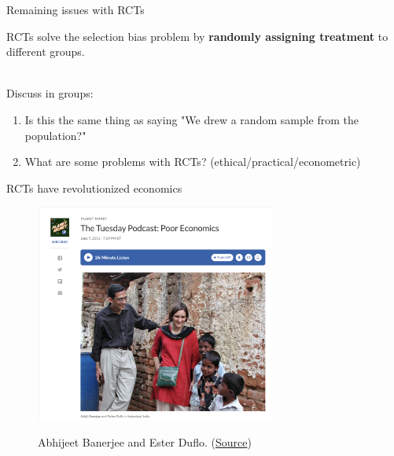 \documentclass[11pt]{beamer}
\begin{document}
\begin{frame}{Remaining issues with RCTs}

RCTs solve the selection bias problem by \textbf{randomly assigning treatment} to different groups.


   \begin{alertblock} {\centering \vspace{-1.5ex} \\ Discuss in groups: \begin{enumerate} 
   \item Is this the same thing as saying "We drew a random sample from the population?" 
   \item What are some problems with RCTs? \tiny{(ethical/practical/econometric)}  
   \end{enumerate}  \vspace{-1.5ex} } \end{alertblock}
 


\end{frame}



\begin{frame}{RCTs have revolutionized economics}

    \begin{figure}
        \centering
        \href{https://www.npr.org/sections/money/2011/06/08/137041672/the-tuesday-podcast-poor-economics}{\includegraphics[width=0.7\textwidth]{figures/TeacherPerformancePay/poor_econ.png}}
        \caption{Abhijeet Banerjee and Ester Duflo. (\href{https://www.npr.org/sections/money/2011/06/08/137041672/the-tuesday-podcast-poor-economics}{Source})}
    \end{figure}
\end{frame}
\end{document}
